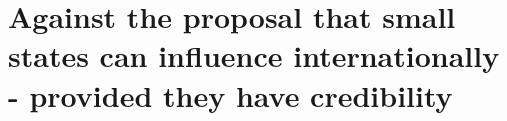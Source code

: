 \chapter{Against the proposal that small states can influence internationally - provided they have credibility}
